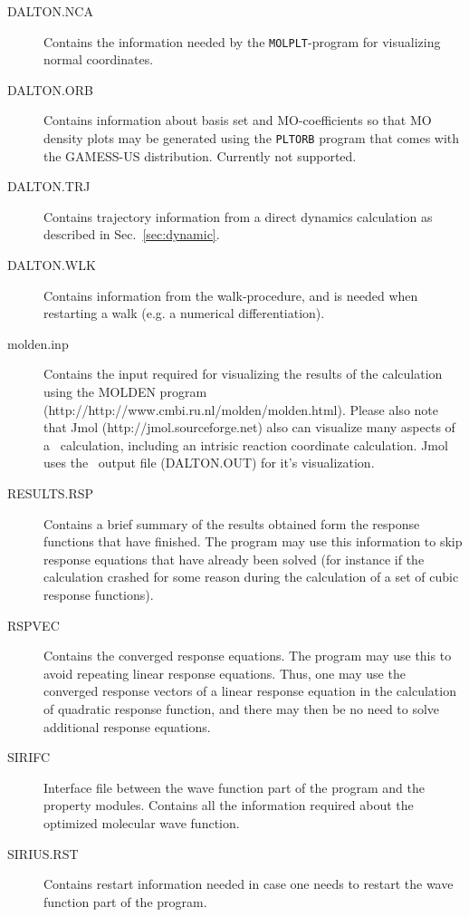 \begin{description}
\item[DALTON.NCA] Contains the information needed by the
\verb|MOLPLT|-program for visualizing normal coordinates.

\item[DALTON.ORB] Contains information about basis set and
MO-coefficients so that MO density plots may be generated using the
\verb|PLTORB| program that comes with the GAMESS-US
distribution. Currently not supported.

\item[DALTON.TRJ] Contains trajectory information from a direct
dynamics calculation as described in
Sec.~\ref{sec:dynamic}.

\item[DALTON.WLK] Contains information from the walk-procedure, and is
needed when restarting a walk (e.g. a numerical differentiation).

\item[molden.inp] Contains the input required for visualizing the
  results of the calculation using the MOLDEN program
  (http://http://www.cmbi.ru.nl/molden/molden.html). Please also note that Jmol (http://jmol.sourceforge.net)
  also can visualize many aspects of a \dalton\ calculation, including an
  intrisic reaction coordinate calculation. Jmol uses the \dalton\ output
  file (DALTON.OUT) for it's visualization.

\item[RESULTS.RSP] Contains a brief summary of the results obtained
  form the response functions that have finished. The program may use
  this information to skip response equations that have already been
  solved (for instance if the calculation crashed for some reason
  during the calculation of a set of cubic response functions).

\item[RSPVEC] Contains the converged response equations. The program
  may use this to avoid repeating linear response equations. Thus, one
  may use the converged response vectors of a linear response equation
  in the calculation of quadratic response function, and there may
  then be no need to solve additional response equations.

\item[SIRIFC] Interface file between the wave function part of the
  program and the property modules. Contains all the information
  required about the optimized molecular wave function.

\item[SIRIUS.RST] Contains restart information needed in case one
  needs to restart the wave function part of the program.
\end{description}
